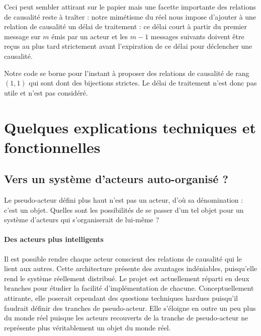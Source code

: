 \documentclass[11pt]{article}
\begin{document}
Ceci peut sembler attirant sur le papier mais une facette importante des relations de causalité reste à traîter : notre mimétisme du réel nous impose d'ajouter à une relation de causalité un délai de traitement : ce délai court à partir du premier message sur $m$ émis par un acteur et les $m - 1$ messages suivants doivent être reçus au plus tard strictement avant l'expiration de ce délai pour déclencher une causalité.

Notre code se borne pour l'instant à proposer des relations de causalité de rang $(1, 1)$ qui sont dont des bijections strictes. Le délai de traitement n'est donc pas utile et n'est pas considéré.

\section{Quelques explications techniques et fonctionnelles}

\subsection{Vers un système d'acteurs auto-organisé ?}\label{auto}

Le pseudo-acteur défini plus haut n'est pas un acteur, d'où sa dénomination : c'est un objet. Quelles sont les possibilités de se passer d'un tel objet pour un système d'acteurs qui s'organiserait de lui-même ?

\paragraph{Des acteurs plus intelligents} Il est possible rendre chaque acteur conscient des relations de causalité qui le lient aux autres. Cette architecture présente des avantages indéniables, puisqu'elle rend le système réellement distribué. Le projet est actuellement réparti en deux branches pour étudier la facilité d'implémentation de chacune. Conceptuellement attirante, elle poserait cependant des questions techniques hardues puisqu'il faudrait définir des \og tranches \fg{} de pseudo-acteur. Elle s'éloigne en outre un peu plus du monde réel puisque les acteurs recouverts de la tranche de pseudo-acteur ne représente plus véritablement un objet du monde réel.
\end{document}
